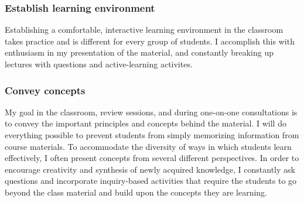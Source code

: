 \subsubsection*{Establish learning environment}
Establishing a comfortable, interactive learning environment in the classroom
takes practice and is different for every group of students.
I accomplish this with enthusiasm in my presentation of the material, and
constantly breaking up lectures with questions and active-learning activites.

\subsubsection*{Convey concepts}
My goal in the classroom, review sessions, and during one-on-one consultations
is to convey the important principles and concepts behind the material.
I will do everything possible to prevent students from simply memorizing
information from course materials.
To accommodate the diversity of ways in which students learn effectively, I
often present concepts from several different perspectives.
In order to encourage creativity and synthesis of newly acquired knowledge,
I constantly ask questions and incorporate inquiry-based activities that
require the students to go beyond the class material and build upon the
concepts they are learning.

